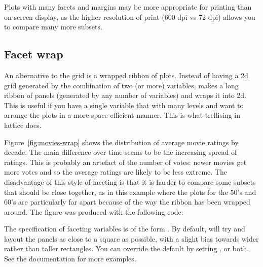 % 


Plots with many facets and margins may be more appropriate for printing than on screen display, as the higher resolution of print (600 dpi vs 72 dpi) allows you to compare many more subsets.

\subsection{Facet wrap}
\label{sub:facet_wrap}

An alternative to the grid is a wrapped ribbon of plots.  Instead of having a 2d grid generated by the combination of two (or more) variables,  makes a long ribbon of panels (generated by any number of variables) and wraps it into 2d.  This is useful if you have a single variable that with many levels and want to arrange the plots in a more space efficient manner.  This is what trellising in lattice does.

Figure~\ref{fig:movies-wrap} shows the distribution of average movie ratings by decade. The main difference over time seems to be the increasing spread of ratings. This is probably an artefact of the number of votes: newer movies get more votes and so the average ratings are likely to be less extreme. The disadvantage of this style of faceting is that it is harder to compare some subsets that should be close together, as in this example where the plots for the 50's and 60's are particularly far apart because of the way the ribbon has been wrapped around. The figure was produced with the following code:

% 


The specification of faceting variables is of the form . By default,  will try and layout the panels as close to a square as possible, with a slight bias towards wider rather than taller rectangles. You can override the default by setting ,  or both. See the documentation for more examples.

